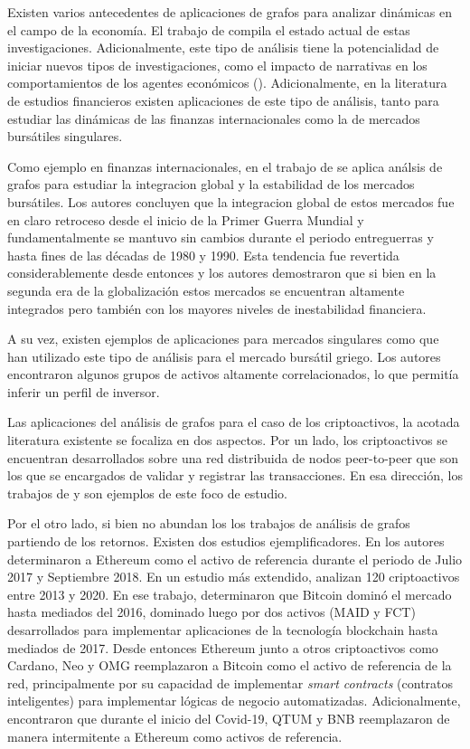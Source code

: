 \documentclass[runningheads,legalpaper,10pt]{etc/llncs}
\begin{document}
Existen varios antecedentes de aplicaciones de grafos para analizar dinámicas en el campo de la economía. El trabajo de  \cite{economicsnetworks} compila el estado actual de estas  investigaciones. Adicionalmente, este tipo de análisis tiene la potencialidad de iniciar nuevos tipos de investigaciones, como el impacto de narrativas en los comportamientos de los agentes económicos (\cite{schiller}). Adicionalmente, en la literatura de estudios financieros existen aplicaciones de este tipo de análisis, tanto para estudiar las dinámicas de las finanzas internacionales como la de mercados bursátiles singulares. 

Como ejemplo en finanzas internacionales, en el trabajo de \cite{towards} se aplica análsis de grafos para estudiar la integracion global y la estabilidad de los mercados bursátiles. Los autores concluyen que la integracion global de estos mercados fue en claro retroceso desde el inicio de la Primer Guerra Mundial y fundamentalmente se mantuvo sin cambios durante el periodo entreguerras y hasta fines de las décadas de 1980 y 1990. Esta tendencia fue revertida considerablemente desde entonces y los autores demostraron que si bien en la segunda era de la globalización estos mercados se encuentran altamente integrados pero también con los  mayores niveles de inestabilidad financiera.

A su vez, existen ejemplos de aplicaciones para mercados singulares como \cite{grekmarket}  que han utilizado este tipo de análisis para el mercado bursátil griego. Los autores encontraron algunos grupos de activos altamente correlacionados, lo que permitía inferir un perfil de inversor.

 Las aplicaciones del análisis de grafos para el caso de los criptoactivos, la acotada literatura existente se focaliza en dos aspectos. Por un lado, los criptoactivos se encuentran desarrollados sobre una red distribuida de nodos peer-to-peer que son los que se encargados de validar y registrar las transacciones. En esa dirección, los trabajos de \cite{btc-blockchain} y \cite{btc-btccash} son ejemplos de este foco de estudio. 
 
 Por el otro lado, si bien no abundan los los trabajos de análisis de grafos partiendo de los retornos. Existen dos estudios ejemplificadores. En  \cite{cryptocurrency_rjc} los autores determinaron a Ethereum como el activo de referencia durante el periodo de Julio 2017 y Septiembre 2018. En un estudio más extendido, \cite{cryptonetwork} analizan 120 criptoactivos entre 2013 y 2020. En ese trabajo, determinaron que Bitcoin dominó el mercado hasta mediados del 2016, dominado luego por dos activos (MAID y FCT) desarrollados para implementar aplicaciones de la tecnología blockchain hasta mediados de 2017. Desde entonces Ethereum junto a otros criptoactivos como Cardano, Neo y OMG reemplazaron a Bitcoin como el activo de referencia de la red, principalmente por su capacidad de implementar \emph{smart contracts} (contratos inteligentes) para implementar lógicas de negocio automatizadas. Adicionalmente, encontraron que durante el inicio del Covid-19, QTUM y BNB reemplazaron de manera intermitente a Ethereum como activos de referencia.
\end{document}
